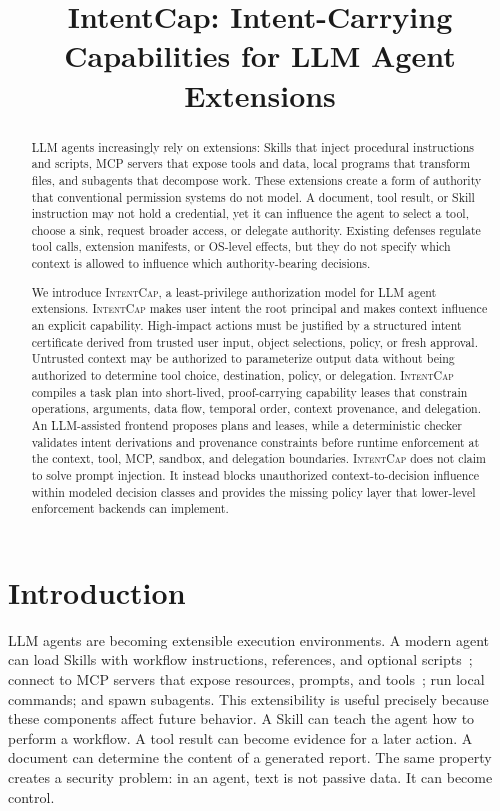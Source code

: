 \documentclass[sigconf,nonacm]{acmart}
\newcommand{\sys}{\textsc{IntentCap}\xspace}
\begin{document}
\title{IntentCap: Intent-Carrying Capabilities for LLM Agent Extensions}

\begin{abstract}
LLM agents increasingly rely on extensions: Skills that inject procedural instructions and scripts, MCP servers that expose tools and data, local programs that transform files, and subagents that decompose work. These extensions create a form of authority that conventional permission systems do not model. A document, tool result, or Skill instruction may not hold a credential, yet it can influence the agent to select a tool, choose a sink, request broader access, or delegate authority. Existing defenses regulate tool calls, extension manifests, or OS-level effects, but they do not specify which context is allowed to influence which authority-bearing decisions.

We introduce \sys, a least-privilege authorization model for LLM agent extensions. \sys makes user intent the root principal and makes context influence an explicit capability. High-impact actions must be justified by a structured intent certificate derived from trusted user input, object selections, policy, or fresh approval. Untrusted context may be authorized to parameterize output data without being authorized to determine tool choice, destination, policy, or delegation. \sys compiles a task plan into short-lived, proof-carrying capability leases that constrain operations, arguments, data flow, temporal order, context provenance, and delegation. An LLM-assisted frontend proposes plans and leases, while a deterministic checker validates intent derivations and provenance constraints before runtime enforcement at the context, tool, MCP, sandbox, and delegation boundaries. \sys does not claim to solve prompt injection. It instead blocks unauthorized context-to-decision influence within modeled decision classes and provides the missing policy layer that lower-level enforcement backends can implement.
\end{abstract}

\maketitle

\section{Introduction}

LLM agents are becoming extensible execution environments. A modern agent can load Skills with workflow instructions, references, and optional scripts~\cite{openai-skills}; connect to MCP servers that expose resources, prompts, and tools~\cite{mcp-spec}; run local commands; and spawn subagents. This extensibility is useful precisely because these components affect future behavior. A Skill can teach the agent how to perform a workflow. A tool result can become evidence for a later action. A document can determine the content of a generated report. The same property creates a security problem: in an agent, text is not passive data. It can become control.
\end{document}
